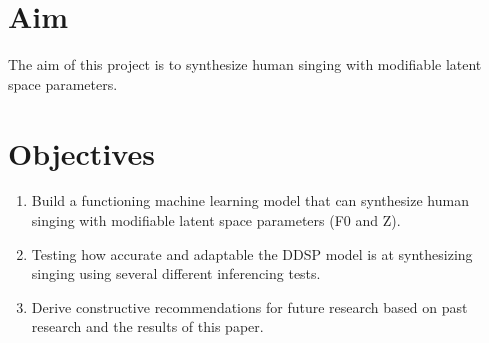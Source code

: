 \section{Aim}

The aim of this project is to synthesize human singing with modifiable latent space parameters.

\section{Objectives}

\begin{enumerate}
    \item Build a functioning machine learning model that can synthesize human singing with modifiable latent space parameters (F0 and Z).
    \item Testing how accurate and adaptable the DDSP model is at synthesizing singing using several different inferencing tests.
    \item Derive constructive recommendations for future research based on past research and the results of this paper.
\end{enumerate}
